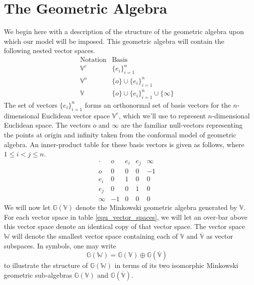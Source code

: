 \documentclass{birkjour}
\theoremstyle{definition}
\theoremstyle{remark}
\numberwithin{equation}{section}
\newcommand{\G}{\mathbb{G}}
\newcommand{\V}{\mathbb{V}}
\newcommand{\Vb}{\mathbb{\overline{V}}}
\newcommand{\W}{\mathbb{W}}
\newcommand{\nvao}{o}
\newcommand{\nvai}{\infty}
\begin{document}
\section{The Geometric Algebra}

We begin here with a description of the structure of the geometric algebra upon
which our model will be imposed.  This
geometric algebra will contain the following nested vector spaces.
\begin{equation}\label{equ_vector_spaces}
\begin{array}{ll}
\mbox{Notation} & \mbox{Basis} \\
\hline
\V^e & \{e_i\}_{i=1}^n \\
\V^o & \{\nvao\}\cup\{e_i\}_{i=1}^n \\
\V & \{\nvao\}\cup\{e_i\}_{i=1}^n\cup\{\nvai\}
\end{array}
\end{equation}
The set of vectors $\{e_i\}_{i=1}^n$ forms an orthonormal set of basis
vectors for the $n$-dimensional Euclidean vector space $\V^e$, which we'll
use to represent $n$-dimensional Euclidean space.
The vectors $\nvao$ and $\nvai$ are the familiar null-vectors representing the
points at origin and infinity taken from the conformal model of geometric algebra.
An inner-product table for these basis vectors is given as follows, where
$1\leq i<j\leq n$.
\begin{equation}
\begin{array}{c|cccc}
\cdot & \nvao & e_i & e_j & \nvai \\
\hline
\nvao & 0 & 0 & 0 & -1 \\
e_i & 0 & 1 & 0 & 0 \\
e_j & 0 & 0 & 1 & 0 \\
\nvai & -1 & 0 & 0 & 0
\end{array}
\end{equation}
We will now let $\G(\V)$ denote the Minkowski geometric algebra generated by $\V$.
For each vector space in table \eqref{equ_vector_spaces}, we will let an over-bar
above this vector space denote an identical copy of that vector space.  The vector
space $\W$ will denote the smallest vector space containing each of $\V$ and $\Vb$
as vector subspaces.  In symbols, one may write
\begin{equation}
\G(\W) = \G(\V)\oplus\G(\Vb)
\end{equation}
to illustrate the structure of $\G(\W)$ in terms of its two isomorphic Minkowski
geometric sub-algebras $\G(\V)$ and $\G(\Vb)$.
\end{document}
